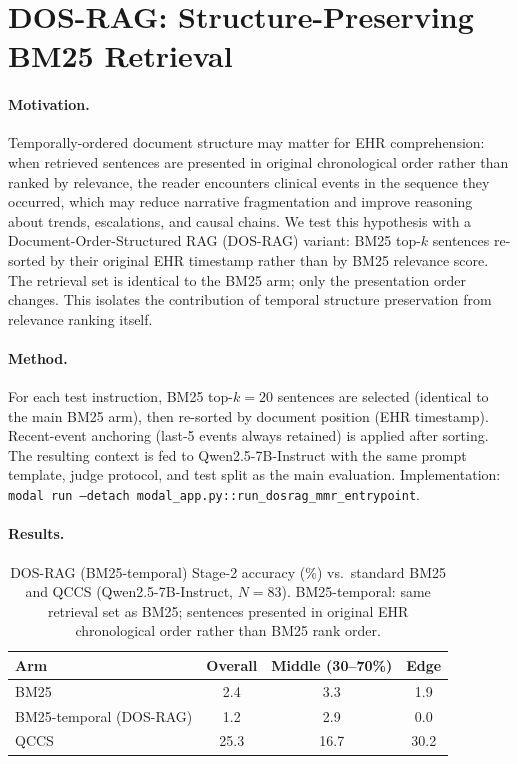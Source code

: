 \documentclass{article}
\begin{document}

\section{DOS-RAG: Structure-Preserving BM25 Retrieval}
\label{app:dosrag}

\paragraph{Motivation.}
Temporally-ordered document structure may matter for EHR comprehension:
when retrieved sentences are presented in original chronological order rather
than ranked by relevance, the reader encounters clinical events in the sequence
they occurred, which may reduce narrative fragmentation and improve reasoning
about trends, escalations, and causal chains.
We test this hypothesis with a Document-Order-Structured RAG (DOS-RAG) variant:
BM25 top-$k$ sentences re-sorted by their original EHR timestamp rather than
by BM25 relevance score. The retrieval set is identical to the BM25 arm; only
the presentation order changes. This isolates the contribution of temporal
structure preservation from relevance ranking itself.

\paragraph{Method.}
For each test instruction, BM25 top-$k{=}20$ sentences are selected (identical
to the main BM25 arm), then re-sorted by document position (EHR timestamp).
Recent-event anchoring (last-5 events always retained) is applied after
sorting. The resulting context is fed to Qwen2.5-7B-Instruct with the
same prompt template, judge protocol, and test split as the main evaluation.
Implementation: \texttt{modal run --detach modal\_app.py::run\_dosrag\_mmr\_entrypoint}.

\paragraph{Results.}

\begin{table}[H]
\centering
\caption{DOS-RAG (BM25-temporal) Stage-2 accuracy (\%) vs.\ standard BM25
  and QCCS (Qwen2.5-7B-Instruct, $N{=}83$).
  BM25-temporal: same retrieval set as BM25; sentences presented in original
  EHR chronological order rather than BM25 rank order.}
\label{tab:dosrag}
\small
\begin{tabular}{@{}lccc@{}}
\toprule
Arm & Overall & Middle (30--70\%) & Edge \\
\midrule
BM25                     & 2.4  & 3.3  & 1.9  \\
BM25-temporal (DOS-RAG)  & 1.2  & 2.9  & 0.0  \\
QCCS                     & 25.3 & 16.7 & 30.2 \\
\bottomrule
\end{tabular}
\end{table}
\end{document}
